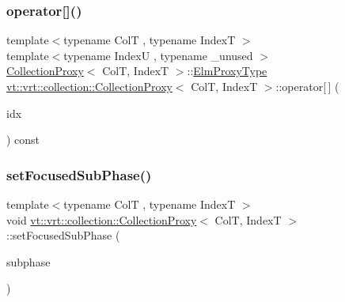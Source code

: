 \mbox{\label{structvt_1_1vrt_1_1collection_1_1_collection_proxy_a81f027fb0c7d2b55ec06a2f91dd8d72e}} 
\subsubsection{\texorpdfstring{operator[]()}{operator[]()}\hspace{0.1cm}{\footnotesize\ttfamily [2/2]}}
{\footnotesize\ttfamily template$<$typename ColT , typename IndexT $>$ \\
template$<$typename IndexU , typename \+\_\+unused $>$ \\
\hyperlink{structvt_1_1vrt_1_1collection_1_1_collection_proxy}{Collection\+Proxy}$<$ ColT, IndexT $>$\+::\hyperlink{structvt_1_1vrt_1_1collection_1_1_collection_proxy_a892c21eae1dca37321d7973f72b55b0a}{Elm\+Proxy\+Type} \hyperlink{structvt_1_1vrt_1_1collection_1_1_collection_proxy}{vt\+::vrt\+::collection\+::\+Collection\+Proxy}$<$ ColT, IndexT $>$\+::operator\mbox{[}$\,$\mbox{]} (\begin{DoxyParamCaption}\item[{IndexU const \&}]{idx }\end{DoxyParamCaption}) const}

\mbox{\label{structvt_1_1vrt_1_1collection_1_1_collection_proxy_abec1613e3487c767e7c8c060abe8781a}} 
\subsubsection{\texorpdfstring{set\+Focused\+Sub\+Phase()}{setFocusedSubPhase()}}
{\footnotesize\ttfamily template$<$typename ColT , typename IndexT $>$ \\
void \hyperlink{structvt_1_1vrt_1_1collection_1_1_collection_proxy}{vt\+::vrt\+::collection\+::\+Collection\+Proxy}$<$ ColT, IndexT $>$\+::set\+Focused\+Sub\+Phase (\begin{DoxyParamCaption}\item[{\hyperlink{structvt_1_1vrt_1_1collection_1_1balance_1_1_element_stats_af9ec1f2527b6569a003579f7950db71e}{balance\+::\+Element\+Stats\+::\+Subphase\+Type}}]{subphase }\end{DoxyParamCaption})}

